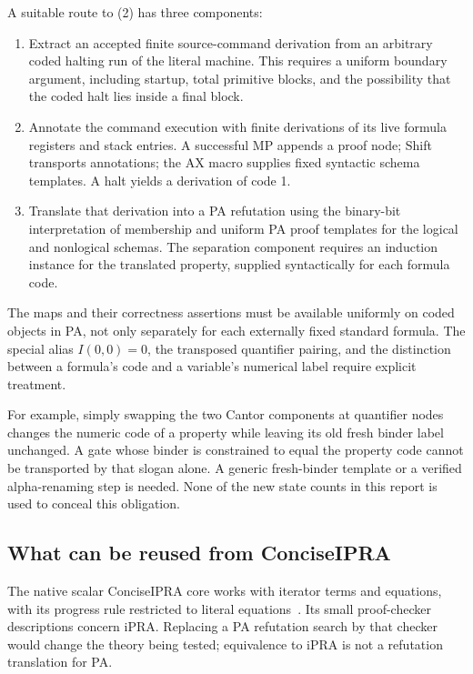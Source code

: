 \documentclass[11pt,letterpaper]{article}
\begin{document}
A suitable route to (2) has three components:
\begin{enumerate}
\item Extract an accepted finite source-command derivation from an
arbitrary coded halting run of the literal machine. This requires a
uniform boundary argument, including startup, total primitive blocks,
and the possibility that the coded halt lies inside a final block.
\item Annotate the command execution with finite derivations of its live
formula registers and stack entries. A successful MP appends a proof
node; Shift transports annotations; the AX macro supplies fixed
syntactic schema templates. A halt yields a derivation of code 1.
\item Translate that derivation into a PA refutation using the binary-bit
interpretation of membership and uniform PA proof templates for the
logical and nonlogical schemas. The separation component requires an
induction instance for the translated property, supplied syntactically
for each formula code.
\end{enumerate}
The maps and their correctness assertions must be available uniformly
on coded objects in PA, not only separately for each externally fixed
standard formula. The special alias \(I(0,0)=0\), the transposed
quantifier pairing, and the distinction between a formula's code and a
variable's numerical label require explicit treatment.

For example, simply swapping the two Cantor components at quantifier
nodes changes the numeric code of a property while leaving its old
fresh binder label unchanged. A gate whose binder is constrained to
equal the property code cannot be transported by that slogan alone.
A generic fresh-binder template or a verified alpha-renaming step is
needed. None of the new state counts in this report is used to conceal
this obligation.

\subsection{What can be reused from ConciseIPRA}

The native scalar ConciseIPRA core works with iterator terms and
equations, with its progress rule restricted to literal equations~\cite{ipra}.
Its small proof-checker descriptions concern iPRA. Replacing a PA
refutation search by that checker would change the theory being tested;
equivalence to iPRA is not a refutation translation for PA.
\end{document}
